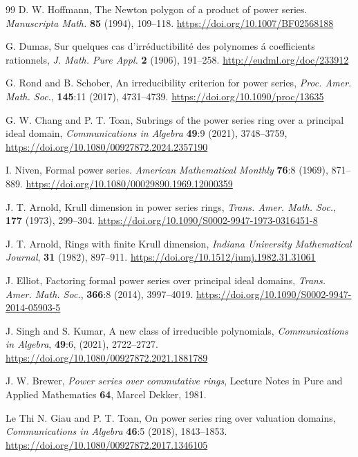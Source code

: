 \documentclass[12pt,reqno]{amsart}%
\begin{document}
\begin{thebibliography}{99}
 D. W. Hoffmann, The Newton polygon of a product of power series. \emph{Manuscripta Math.} \textbf{85} (1994), 109--118. \url{https://doi.org/10.1007/BF02568188}

 G. Dumas, Sur quelques cas d'irr\'eductibilit\'e des polynomes \'a coefficients rationnels, \emph{J. Math. Pure Appl.} \textbf{2} (1906), 191--258. \url{http://eudml.org/doc/233912}

 G. Rond and B. Schober, {{An irreducibility criterion for power series}}, \emph{Proc. Amer. Math. Soc.}, {\textbf{145}:11} (2017), 4731--4739. \url{https://doi.org/10.1090/proc/13635}

 {G. W. Chang and P. T. Toan}, {{Subrings of the power series ring over a principal ideal domain}},
\emph{Communications in Algebra} \textbf{49}:9 (2021), {3748--3759}, \url{https://doi.org/10.1080/00927872.2024.2357190}


 I. Niven, Formal power series. \emph{American Mathematical Monthly}  \textbf{76}:8 (1969), 871--889. \url{https://doi.org/10.1080/00029890.1969.12000359}

 J. T. Arnold, {{Krull dimension in power series rings}}, \emph{Trans. Amer. Math. Soc.}, {\textbf{177}} (1973), 299--304. \url{https://doi.org/10.1090/S0002-9947-1973-0316451-8}

 J. T. Arnold, {{Rings with finite Krull dimension}}, \emph{Indiana University Mathematical Journal}, {\textbf{31}} (1982), 897--911. \url{https://doi.org/10.1512/iumj.1982.31.31061}

 J. Elliot, {{Factoring formal power series over principal ideal domains}}, \emph{Trans. Amer. Math. Soc.}, {\textbf{366}:8} (2014), 3997--4019. \url{https://doi.org/10.1090/S0002-9947-2014-05903-5}

 J. Singh and S. Kumar, {{A new class of irreducible polynomials}}, \emph{Communications in  Algebra}, {\textbf{49}:6}, (2021), 2722--2727. \url{https://doi.org/10.1080/00927872.2021.1881789}

 J. W. Brewer, \emph{Power series over commutative rings}, Lecture Notes in Pure and Applied Mathematics {\textbf{64}}, Marcel Dekker, 1981. 

 Le Thi N. Giau and P. T. Toan, {{On power series ring over  valuation domains}}, \emph{Communications in Algebra} {\textbf{46}:5} (2018), 1843--1853. \url{https://doi.org/10.1080/00927872.2017.1346105}


\end{thebibliography}
\end{document}
